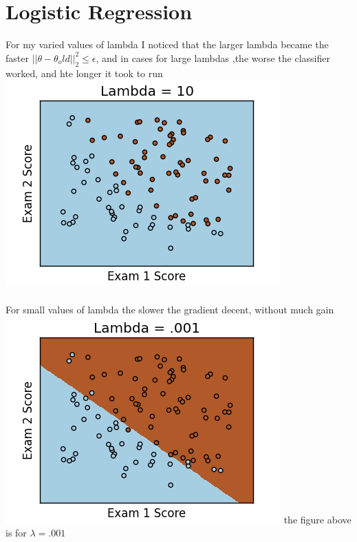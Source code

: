 \documentclass{article}
\begin{document}
\section {Logistic Regression}
For my varied values of lambda I noticed that the larger lambda became the faster $||\theta -\theta_old||^{2}_2 \leq \epsilon$, and in cases for large lambdas ,the worse the classifier worked, and hte longer it took to run 
\linebreak
\includegraphics[width = \linewidth]{Lambda10.png}

\paragraph{}
For small values of lambda the slower the gradient decent, without much gain  
\linebreak
\includegraphics[width = \linewidth]{Lambda_001.png}
\linebreak
the figure above is for $ \lambda = .001$ 
\end{document}
